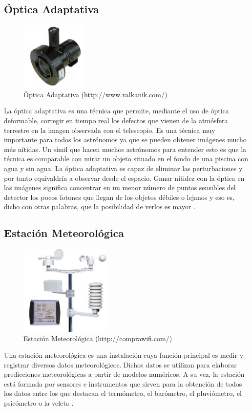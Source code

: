 \subsection{Óptica Adaptativa}
\begin{figure}[htb]
\centering
\includegraphics[width=0.3\textwidth]{./imagenes/opticaAdaptativa}
\caption{Óptica Adaptativa (http://www.valkanik.com/)} \label{fig:opticaAdaptativa}
\end{figure}
La óptica adaptativa es una técnica que permite, mediante el uso de óptica deformable, corregir en tiempo real los defectos que vienen de la atmósfera terrestre en la imagen observada con el telescopio. Es una técnica muy importante para todos los astrónomos ya que se pueden obtener imágenes mucho más nítidas. Un símil que hacen muchos astrónomos para entender esto es que la técnica es comparable con mirar un objeto situado en el fondo de una piscina con agua y sin agua.
La óptica adaptativa es capaz de eliminar las perturbaciones y por tanto equivaldría a observar desde el espacio. Ganar nitidez con la óptica en las imágenes significa concentrar en un menor número de puntos sensibles del detector los pocos fotones que llegan de los objetos débiles o lejanos y eso es, dicho con otras palabras, que la posibilidad de verlos es mayor \cite{OpticaAdaptativa}.


\subsection{Estación Meteorológica}
\begin{figure}[htb]
\centering
\includegraphics[width=0.4\textwidth]{./imagenes/estacionMeteorologica}
\caption{Estación Meteorológica (http://comprawifi.com/)} \label{fig:estacionMeteorologica}
\end{figure}
Una estación meteorológica es una instalación cuya función principal es medir y registrar diversos datos meteorológicos. Dichos datos se utilizan para elaborar predicciones meteorológicas a partir de modelos numéricos.
A su vez, la estación está formada por sensores e instrumentos que sirven para la obtención de todos los datos entre los que destacan el termómetro, el barómetro, el pluviómetro, el psicómetro o la veleta \cite{EstacionMeteorologica}.


